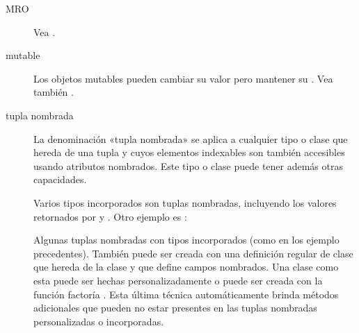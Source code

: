 \documentclass[a4,10pt,spanish]{sphinxmanual}
\begin{document}
\begin{description}
\item[{MRO\label{\detokenize{glossary:term-MRO}}}] \leavevmode
\sphinxAtStartPar
Vea {\hyperref[\detokenize{glossary:term-method-resolution-order}]{}}.

\item[{mutable\label{\detokenize{glossary:term-mutable}}}] \leavevmode
\sphinxAtStartPar
Los objetos mutables pueden cambiar su valor pero mantener su .  Vea también {\hyperref[\detokenize{glossary:term-immutable}]{}}.

\item[{tupla nombrada\label{\detokenize{glossary:term-named-tuple}}}] \leavevmode
\sphinxAtStartPar
La denominación «tupla nombrada» se aplica a cualquier tipo o clase que hereda de una tupla y cuyos elementos indexables son también accesibles usando atributos nombrados. Este tipo o clase puede tener además otras capacidades.

\sphinxAtStartPar
Varios tipos incorporados son tuplas nombradas, incluyendo los valores retornados por  y .  Otro ejemplo es :

\begin{sphinxVerbatim}[commandchars=\\\{\}]
\PYG{p}{[}\PYG{p}{]}                   
              
    
\end{sphinxVerbatim}

\sphinxAtStartPar
Algunas tuplas nombradas con tipos incorporados (como en los ejemplo precedentes). También puede ser creada con una definición regular de clase que hereda de la clase   y que define campos nombrados.  Una clase como esta puede ser hechas personalizadamente o puede ser creada con la función factoría .  Esta última técnica automáticamente brinda métodos adicionales que pueden no estar presentes en las tuplas nombradas personalizadas o incorporadas.


\end{description}
\end{document}
